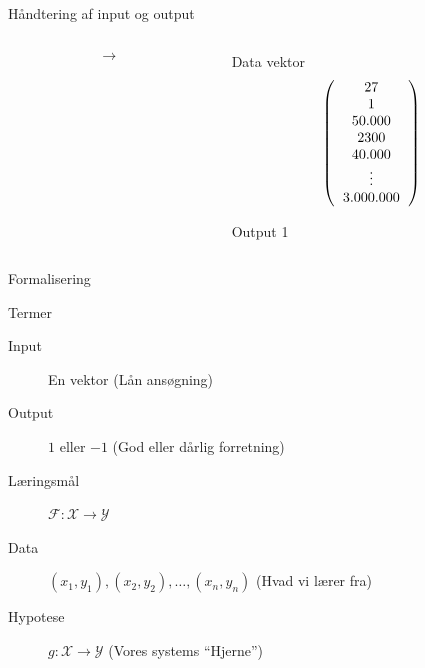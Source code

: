 \documentclass[12pt,t]{beamer}
\begin{document}
\begin{frame}[c]{Håndtering af input og output}
\begin{columns}
            \begin{column}{0.2\textwidth}
                \vspace{4em}
                \begin{Huge}
                    $$
                        \rightarrow
                    $$
                \end{Huge}
            \end{column}
            \begin{column}{0.3\textwidth}
                \begin{block}{Data vektor}
                    $$
                        \left(
                        \begin{tabular}{c}
                            27      \\
                            1      \\
                            50.000 \\
                            2300   \\
                            40.000 \\
                            \vdots \\
                            3.000.000
                        \end{tabular}
                        \right)
                    $$
                \end{block}
                \begin{block}{Output}
                    1
                \end{block}
            \end{column}
        \end{columns}
    \end{frame}

    \begin{frame}[t]{Formalisering}
        \begin{block}{Termer}
            \begin{description}
                \item[Input] En vektor (Lån ansøgning)  \pause
                \item[Output] $1$ eller $-1$ (God eller dårlig forretning) \pause
                \item[Læringsmål]$\mathcal{F}: \mathcal{X} \rightarrow
                                   \mathcal{Y}$ \pause
                \item[Data] $(x_1,y_1), (x_2,y_2),\dots,(x_n,y_n)$
                (Hvad vi lærer fra) \pause
                \item[Hypotese] $g: \mathcal{X} \rightarrow
                                   \mathcal{Y}$ (Vores systems ``Hjerne'')
            \end{description}
        \end{block}
    \end{frame}
\end{document}
